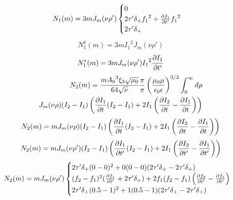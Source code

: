 %
\textcolor{lightgray} { \begin{equation*} \begin{aligned}
N_1 (m) =  3 m J_m (\nu \rho') \begin{cases} 0 \\
2 \tau' \delta_+ {f_1}^2 + \frac{\partial f_1}{\partial t'} {f_1}^2 \\
2 \tau' \delta_+
\end{cases} \end{aligned} \end{equation*} }
%
\begin{equation*} \begin{aligned}
N_1^\delta (m) = 3 m {I_1}^2 J_m (\nu \rho')
\end{aligned} \end{equation*}
%
\begin{equation*} \begin{aligned}
N_1^* (m) =  3 m J_m (\nu \rho') {I_1}^2 \frac{\partial I_1}{\partial t'}
\end{aligned} \end{equation*}
%
\textcolor{lightgray} { \begin{equation*} \begin{aligned}
N_2 (m) = \frac{m {A_0}^3 \xi_3 \sqrt{\mu_0}}{64 \sqrt{\nu}} \frac{\pi}{\pi}
\left( \frac{\mu_0 \mu} {\epsilon_0 \epsilon} \right)^{3/2} 
\int_{0}^{\infty} d \rho \\
J_m (\nu \rho) (I_2 - I_1) \left( \frac{\partial I_1}{\partial t} (I_2 - I_1) + 
2 I_1 \left( \frac{\partial I_2}{\partial t} - \frac{\partial I_1}{\partial t} \right) \right)
\end{aligned} \end{equation*} }
%
\textcolor{lightgray} { \begin{equation*} \begin{aligned}
N_2 (m) = m J_m (\nu \rho) (I_2 - I_1) \left( \frac{\partial I_1}{\partial t} (I_2 - I_1) + 
2 I_1 \left( \frac{\partial I_2}{\partial t} - \frac{\partial I_1}{\partial t} \right) \right)
\end{aligned} \end{equation*} }
%
\begin{equation*} \begin{aligned}
N_2 (m) = m J_m (\nu \rho') (I_2 - I_1) \left( \frac{\partial I_1}{\partial t'} (I_2 - I_1) + 
2 I_1 \left( \frac{\partial I_2}{\partial t'} - \frac{\partial I_1}{\partial t'} \right) \right)
\end{aligned} \end{equation*}
%
\textcolor{lightgray} { \begin{equation*} \begin{aligned}
N_2 (m) = m J_m (\nu \rho') \begin{cases}
2 \tau' \delta_+ (0 - 0)^2 + 0 (0 - 0) (2 \tau' \delta_+ - 2 \tau' \delta_+) \\
(f_2 - f_1)^2 (\frac{\partial f_1}{\partial t'} + 2 \tau' \delta_+) + 2 f_1 (f_2 - f_1) \left( 
\frac{\partial f_2}{\partial t'} - \frac{\partial f_1}{\partial t'} \right) \\
2 \tau' \delta_+ (0.5 - 1)^2 + 1 (0.5 - 1) (2 \tau' \delta_+ - 2 \tau' \delta_+)
\end{cases} \end{aligned} \end{equation*} }
